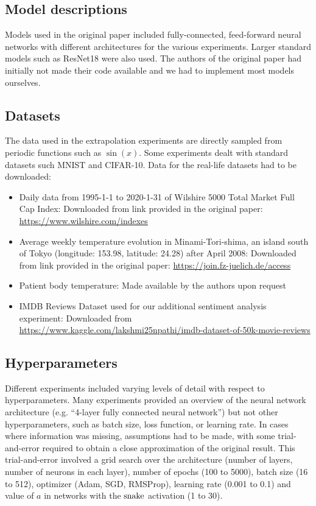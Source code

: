 \subsection{Model descriptions}

Models used in the original paper included fully-connected, feed-forward neural networks with different architectures for the various experiments. Larger standard models such as ResNet18 were also used. The authors of the original paper had initially not made their code available and we had to implement most models ourselves.

\subsection{Datasets}

The data used in the extrapolation experiments are directly sampled from periodic functions such as $\sin(x)$. Some experiments dealt with standard datasets such MNIST and CIFAR-10.
Data for the real-life datasets had to be downloaded:
\begin{itemize}

    \item Daily data from 1995-1-1 to 2020-1-31 of Wilshire 5000 Total Market Full Cap Index: Downloaded from link provided in the original paper: \url{https://www.wilshire.com/indexes}
    \item Average weekly temperature evolution in Minami-Tori-shima, an island south of Tokyo (longitude: 153.98, latitude: 24.28) after April 2008: Downloaded from link provided in the original paper: \url{https://join.fz-juelich.de/access}
    \item Patient body temperature: Made available by the authors upon request
    \item IMDB Reviews Dataset used for our additional sentiment analysis experiment: Downloaded from \url{https://www.kaggle.com/lakshmi25npathi/imdb-dataset-of-50k-movie-reviews}
    
    
\end{itemize}

\subsection{Hyperparameters}

Different experiments included varying levels of detail with respect to hyperparameters. Many experiments provided an overview of the neural network architecture (e.g. ``4-layer fully connected neural network'') but not other hyperparameters, such as batch size, loss function, or learning rate. In cases where information was missing, assumptions had to be made, with some trial-and-error required to obtain a close approximation of the original result. This trial-and-error involved a grid search over the architecture (number of layers, number of neurons in each layer), number of epochs (100 to 5000), batch size (16 to 512), optimizer (Adam, SGD, RMSProp), learning rate (0.001 to 0.1) and value of $a$ in networks with the $ \operatorname{snake} $ activation (1 to 30).

